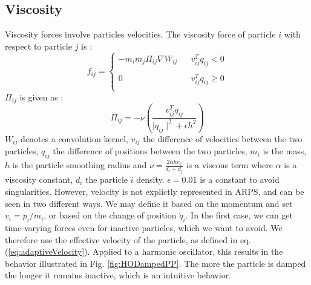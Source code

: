 \documentclass[11pt, oneside, a4paper]{memoir}
\begin{document}
\subsection{Viscosity}
Viscosity forces involve particles velocities. The viscosity force of particle $i$ with respect to particle $j$ is :
\begin{equation}
	\label{eq:viscosityForces}
	f_{ij} =
	\left\lbrace	
	\begin{array}{lrr}
	-m_{i}m_{j}\Pi_{ij}\nabla W_{ij} & & v_{ij}^{T}q_{ij}<0\\
	& & \\
	0 & & v_{ij}^{T}q_{ij} \geq 0 \\
	\end{array}		
	\right.
\end{equation}
$\Pi_{ij}$ is given as :
\begin{equation}
\label{eq:pij}
	\Pi_{ij} = -\nu\left( \frac{v_{ij}^{T}q_{ij}}{ \mid q_{ij} \mid^{2} + \epsilon h^{2} } \right)
\end{equation}
$W_{ij}$ denotes a convolution kernel, $v_{ij}$ the difference of velocities between the two particles, $q_{ij}$ the difference of positions between the two particles, $m_{i}$ is the mass, $h$ is the particle smoothing radius and $\nu = \frac{2 \alpha h c_{s}}{ d_{i} + d_{j} }$ is a viscous term where $\alpha$ is a viscosity constant,
$d_{i}$ the particle $i$ density.
$\epsilon=0.01$ is a constant to avoid singularities.
\newline \newline
However, velocity is not explictly represented in ARPS, and can be seen in two different ways. We may define it based on the momentum and set $ v_{i} = p_{i} / m_{i} $, or based on the change of position $  \dot{q}_{i}$.
In the first case, we can get time-varying forces even for inactive particles, which we want to avoid.
We therefore use the effective velocity of the particle, as defined in eq.(\ref{eq:adaptiveVelocity}).
Applied to a harmonic oscillator, this results in the behavior illustrated in Fig. \ref{fig:HODampedPP}.
The more the particle is damped the longer it remains inactive, which is an intuitive behavior.
\end{document}
